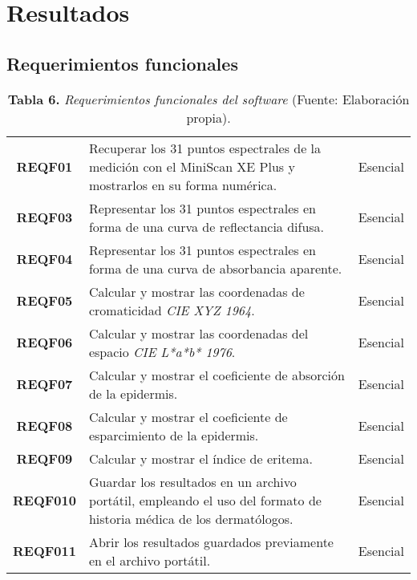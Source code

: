 \chapter{\label{cap:4}Resultados}

\section{Requerimientos funcionales}
\FloatBarrier
\vline
	\begin{table}[htb]
		\small
		\caption{\textbf{Tabla 6.} \textit{Requerimientos funcionales del software} (Fuente: Elaboraci\'{o}n propia).}
		\centering
		\setlength{\extrarowheight}{5pt}
		\begin{tabulary}{15.5cm}{|c|L|c|}
			\hline
			 &  & \\ \hline
			\textbf{REQF01} & Recuperar los 31 puntos espectrales de la medici\'{o}n con el MiniScan XE Plus y mostrarlos en su forma num\'{e}rica. & Esencial\\ \hline

			\textbf{REQF03} & Representar los 31 puntos espectrales en forma de una curva de reflectancia difusa. & Esencial\\ \hline
			\textbf{REQF04} & Representar los 31 puntos espectrales en forma de una curva de absorbancia aparente. & Esencial\\ \hline
			\textbf{REQF05} & Calcular y mostrar las coordenadas de cromaticidad \textit{CIE XYZ 1964}. & Esencial\\ \hline
			\textbf{REQF06} & Calcular y mostrar las coordenadas del espacio \textit{CIE L*a*b* 1976}. & Esencial\\ \hline
			\textbf{REQF07} & Calcular y mostrar el coeficiente de absorci\'{o}n de la epidermis. & Esencial\\ \hline
			\textbf{REQF08} & Calcular y mostrar el coeficiente de esparcimiento de la epidermis. & Esencial\\ \hline
			\textbf{REQF09} & Calcular y mostrar el \'{i}ndice de eritema. & Esencial\\ \hline
			\textbf{REQF010} & Guardar los resultados en un archivo port\'{a}til, empleando el uso del formato de historia m\'{e}dica de los dermat\'{o}logos. & Esencial\\ \hline
			\textbf{REQF011} & Abrir los resultados guardados previamente en el archivo port\'{a}til. & Esencial\\ \hline
		\end{tabulary}
	\end{table}
\FloatBarrier %

